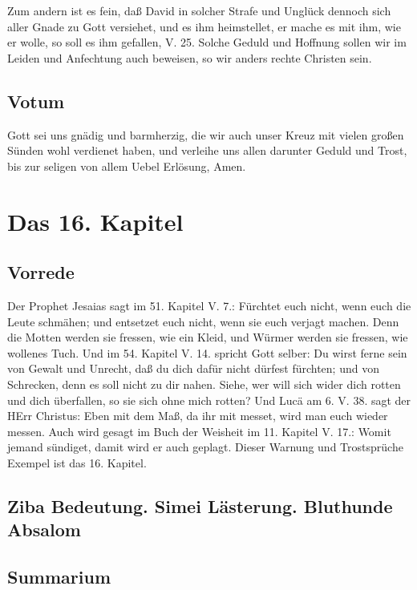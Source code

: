 Zum andern ist es fein, daß David in solcher Strafe und Unglück dennoch sich aller Gnade zu Gott versiehet, und es ihm heimstellet, er mache es mit ihm, wie er wolle, so soll es ihm gefallen, V. 25. Solche Geduld und Hoffnung sollen wir im Leiden und Anfechtung auch beweisen, so wir anders rechte Christen sein.

\section{Votum}

Gott sei uns gnädig und barmherzig, die wir auch unser Kreuz mit vielen großen Sünden wohl verdienet haben, und verleihe uns allen darunter Geduld und Trost, bis zur seligen von allem Uebel Erlösung, Amen.

\chapter{Das 16. Kapitel}

\section{Vorrede}

Der Prophet Jesaias sagt im 51. Kapitel V. 7.: Fürchtet euch nicht, wenn euch die Leute schmähen; und entsetzet euch nicht, wenn sie euch verjagt machen. Denn die Motten werden sie fressen, wie ein Kleid, und Würmer werden sie fressen, wie wollenes Tuch. Und im 54. Kapitel V. 14. spricht Gott selber: Du wirst ferne sein von Gewalt und Unrecht, daß du dich dafür nicht dürfest fürchten; und von Schrecken, denn es soll nicht zu dir nahen. Siehe, wer will sich wider dich rotten und dich überfallen, so sie sich ohne mich rotten? Und Lucä am 6. V. 38. sagt der HErr Christus: Eben mit dem Maß, da ihr mit messet, wird man euch wieder messen. Auch wird gesagt im Buch der Weisheit im 11. Kapitel V. 17.: Womit jemand sündiget, damit wird er auch geplagt. Dieser Warnung und Trostsprüche Exempel ist das 16. Kapitel.

\section{Ziba Bedeutung. Simei Lästerung. Bluthunde Absalom}

\section{Summarium}

